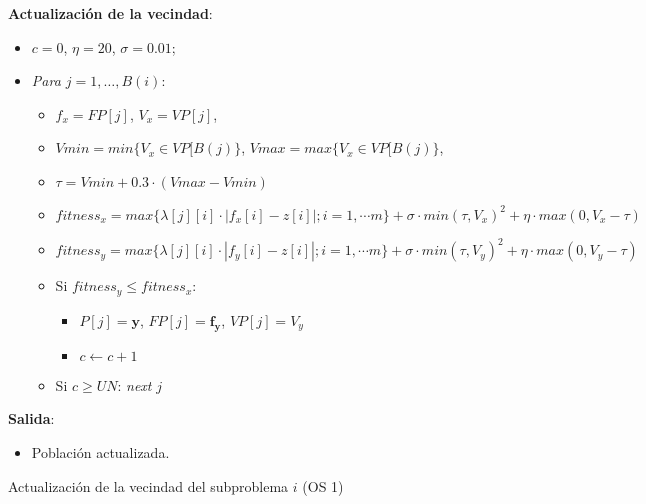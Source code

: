 \begin{center}
\begin{minipage}[H]{0.8\linewidth}
\begin{algorithm}[H]
 \textbf{Actualización de la vecindad}:\\
        \begin{itemize}
        	\vspace{0.15cm} \item $c=0$,  $\eta= 20$, $\sigma=0.01$;
        	\vspace{0.15cm}\item \textit{Para $j=1, \dots, B(i)$}:
        	\begin{itemize}
        		\vspace{0.15cm}\item $f_x=FP[j]$, $V_x=VP[j]$, 
        		\vspace{0.15cm}\item $Vmin = min\{V_x \in VP[B(j)\}$, $Vmax = max\{V_x \in VP[B(j)\}$, 
        		\vspace{0.15cm}\item $\tau= Vmin + 0.3 \cdot (Vmax - Vmin)$
        		\vspace{0.15cm}\item $fitness_x = max \{\lambda[j][i] \cdot  \left\vert f_x[i]-z[i] \right\vert; i=1, \cdots m\} + \sigma \cdot min(\tau, V_x)^2 + \eta \cdot max(0, V_x-\tau)$
        		\vspace{0.15cm}\item $fitness_y = max \{\lambda[j][i] \cdot  \left\vert f_y[i]-z[i] \right\vert; i=1, \cdots m\} + \sigma \cdot min(\tau, V_y)^2 + \eta \cdot max(0, V_y-\tau)$
        		\vspace{0.15cm}\item Si $fitness_y \leq fitness_x$:
            	\begin{itemize}
            		\vspace{0.15cm}\item $P[j]=\boldsymbol{y}$, $FP[j]=\boldsymbol{f_y}$, $VP[j]=V_y$
            		\vspace{0.15cm}\item $c \gets c + 1$
				\end{itemize}            	 
            	\vspace{0.15cm}\item Si $c \geq UN$: \textit{next} $j$
        	\end{itemize}
        \end{itemize}
    \vspace{0.3cm} 
    
    \textbf{Salida}:
    \begin{itemize}
        \item Población actualizada.
    \end{itemize}
 \caption{Actualización de la vecindad del subproblema $i$ (OS 1)}
 \label{alg:5}
\end{algorithm}
\end{minipage} \\
\end{center}

